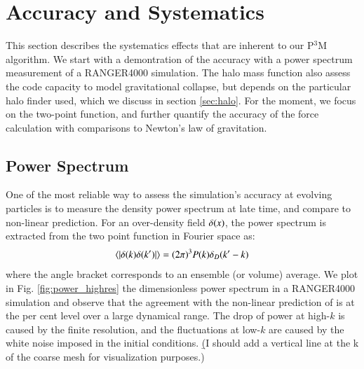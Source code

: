\section{Accuracy and Systematics}
\label{sec:accuracy}
 
 This section describes the systematics effects that are inherent to our P$^{3}$M algorithm.
 We start with a demontration of the accuracy with a power spectrum measurement of a RANGER4000 simulation. 
 The halo mass function also assess the code capacity to model gravitational collapse, 
 but depends on the particular halo finder used, which we discuss in section \ref{sec:halo}.
 For the moment, we focus on the two-point function, and further quantify the accuracy of the force calculation
 with comparisons to Newton's law of gravitation.
 
 
 \subsection{Power Spectrum}
 \label{subsec:powerspectrum}
 
One of the most reliable way to assess the simulation's accuracy at evolving particles
is to measure the density power spectrum at late time, and compare to non-linear prediction. 
For an over-density field $\delta({\bf \it x})$, the power spectrum is extracted from the two point function in Fourier space as:
\begin{eqnarray}
\langle | \delta ({\bf \it k}) \delta ({\bf \it k'}) | \rangle = (2\pi)^{3}P(k)\delta_{D}({\bf \it k'} - {\bf \it k})
\label{eq:power}
\end{eqnarray}
where the angle bracket corresponds to an ensemble (or volume) average.
We plot in Fig. \ref{fig:power_highres} the dimensionless power spectrum in a RANGER4000 simulation and
observe that the agreement with the non-linear prediction of \cite{Lewis:1999bs} is at the per cent level over a large dynamical range.
The drop of power at high-$k$ is caused by the finite resolution, and the fluctuations at low-$k$ are caused by the white noise imposed in the initial conditions. {\b (I should add a vertical line at the k of the coarse mesh for visualization purposes.)}

